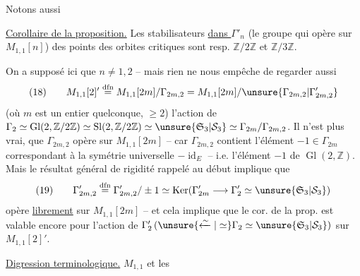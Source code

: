 Notons  aussi

\uline{Corollaire de la proposition.}  Les stabilisateurs \uline{dans $\Gamma'_n$} (le groupe qui opère \uline{} sur $M_{1,1}[n]$) des points des  orbites critiques sont resp. $\mathbb Z/2\mathbb Z$ et $\mathbb Z/3\mathbb Z$. 


On a supposé ici que $n\ne1,2$ -- mais rien ne nous empêche de regarder aussi 
\[
(18)\qquad M_{1,1}[2]'\overset{\mathrm{dfn}}{=}M_{1,1}[2m]/\Gamma_{2m,2}
=M_{1,1}[2m]/\unsure{\Gamma_{2m,2}|\Gamma'_{2m,2}}
\]
(où $m$ est un entier quelconque, $\ge2$)
l'action de $\Gamma_2\simeq\operatorname{Gl}(2,\mathbb Z/2\mathbb Z)\simeq\operatorname{Sl}(2,\mathbb Z/2\mathbb Z)\simeq\unsure{\mathfrak S_3|\mathcal S_3}\simeq\Gamma_{2m}/\Gamma_{2m,2}$.  Il n'est plus vrai,  que $\Gamma_{2m,2}$ opère  sur $M_{1,1}[2m]$ -- car $\Gamma_{2m,2}$ contient l'élément $-1\in\Gamma_{2m}$ correspondant à la symétrie universelle $-\operatorname{id}_E$ -- i.e.  l'élément  $-1$ de $\operatorname{Gl}(2,\mathbb Z)$. Mais le résultat général de rigidité rappelé au début implique que 
\[
(19)\qquad\Gamma'_{2m,2}\overset{\mathrm{dfn}}{=}\Gamma_{2m,2}'/\pm1
\simeq\operatorname{Ker}(\Gamma'_{2m}\longrightarrow\Gamma'_2\simeq\unsure{\mathfrak S_3|\mathcal S_3})
\]
opère   \uline{librement} sur $M_{1,1}[2m]$ -- et cela implique que le cor. de la prop. est valable encore pour l'action de $\Gamma'_2\,(\unsure{\xleftarrow{\sim}|\simeq}\Gamma_2\simeq\unsure{\mathfrak S_3|\mathcal S_3})$ sur $M_{1,1}[2]'$.

\uline{Digression terminologique.} $M_{1,1}$  et les

